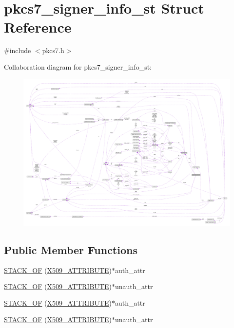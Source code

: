 \hypertarget{structpkcs7__signer__info__st}{}\section{pkcs7\+\_\+signer\+\_\+info\+\_\+st Struct Reference}
\label{structpkcs7__signer__info__st}


{\ttfamily \#include $<$pkcs7.\+h$>$}



Collaboration diagram for pkcs7\+\_\+signer\+\_\+info\+\_\+st\+:\nopagebreak
\begin{figure}[H]
\begin{center}
\leavevmode
\includegraphics[width=350pt]{structpkcs7__signer__info__st__coll__graph}
\end{center}
\end{figure}
\subsection*{Public Member Functions}
\begin{DoxyCompactItemize}
\item 
\hyperlink{structpkcs7__signer__info__st_a9cd08b2a6046dbf625af2d140ea834b9}{S\+T\+A\+C\+K\+\_\+\+OF} (\hyperlink{crypto_2x509_2x509_8h_aa4f1a62a9d2dd8cb6780fe2713737c0f}{X509\+\_\+\+A\+T\+T\+R\+I\+B\+U\+TE})$\ast$auth\+\_\+attr
\item 
\hyperlink{structpkcs7__signer__info__st_a6a3a371997854c312e026589aa204e71}{S\+T\+A\+C\+K\+\_\+\+OF} (\hyperlink{crypto_2x509_2x509_8h_aa4f1a62a9d2dd8cb6780fe2713737c0f}{X509\+\_\+\+A\+T\+T\+R\+I\+B\+U\+TE})$\ast$unauth\+\_\+attr
\item 
\hyperlink{structpkcs7__signer__info__st_a9cd08b2a6046dbf625af2d140ea834b9}{S\+T\+A\+C\+K\+\_\+\+OF} (\hyperlink{crypto_2x509_2x509_8h_aa4f1a62a9d2dd8cb6780fe2713737c0f}{X509\+\_\+\+A\+T\+T\+R\+I\+B\+U\+TE})$\ast$auth\+\_\+attr
\item 
\hyperlink{structpkcs7__signer__info__st_a6a3a371997854c312e026589aa204e71}{S\+T\+A\+C\+K\+\_\+\+OF} (\hyperlink{crypto_2x509_2x509_8h_aa4f1a62a9d2dd8cb6780fe2713737c0f}{X509\+\_\+\+A\+T\+T\+R\+I\+B\+U\+TE})$\ast$unauth\+\_\+attr
\end{DoxyCompactItemize}

